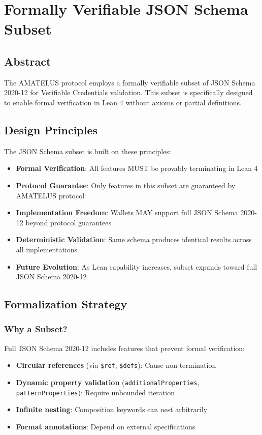 \chapter{Formally Verifiable JSON Schema Subset}

\section{Abstract}

The AMATELUS protocol employs a formally verifiable subset of JSON Schema 2020-12 for Verifiable Credentials validation. This subset is specifically designed to enable formal verification in Lean 4 without axioms or partial definitions.

\section{Design Principles}

The JSON Schema subset is built on these principles:

\begin{itemize}
  \item \textbf{Formal Verification}: All features MUST be provably terminating in Lean 4
  \item \textbf{Protocol Guarantee}: Only features in this subset are guaranteed by AMATELUS protocol
  \item \textbf{Implementation Freedom}: Wallets MAY support full JSON Schema 2020-12 beyond protocol guarantees
  \item \textbf{Deterministic Validation}: Same schema produces identical results across all implementations
  \item \textbf{Future Evolution}: As Lean capability increases, subset expands toward full JSON Schema 2020-12
\end{itemize}

\section{Formalization Strategy}

\subsection{Why a Subset?}

Full JSON Schema 2020-12 includes features that prevent formal verification:

\begin{itemize}
  \item \textbf{Circular references} (via \texttt{\$ref}, \texttt{\$defs}): Cause non-termination
  \item \textbf{Dynamic property validation} (\texttt{additionalProperties}, \texttt{patternProperties}): Require unbounded iteration
  \item \textbf{Infinite nesting}: Composition keywords can nest arbitrarily
  \item \textbf{Format annotations}: Depend on external specifications
\end{itemize}

